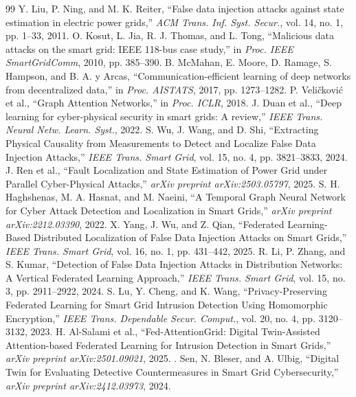 \documentclass[10pt, a4paper, twocolumn]{article}
\begin{document}
\begin{thebibliography}{99}
 Y. Liu, P. Ning, and M. K. Reiter, ``False data injection attacks against state estimation in electric power grids,'' \textit{ACM Trans. Inf. Syst. Secur.}, vol. 14, no. 1, pp. 1--33, 2011.
 O. Kosut, L. Jia, R. J. Thomas, and L. Tong, ``Malicious data attacks on the smart grid: IEEE 118-bus case study,'' in \textit{Proc. IEEE SmartGridComm}, 2010, pp. 385--390.
 B. McMahan, E. Moore, D. Ramage, S. Hampson, and B. A. y Arcas, ``Communication-efficient learning of deep networks from decentralized data,'' in \textit{Proc. AISTATS}, 2017, pp. 1273--1282.
 P. Veli\v{c}kovi\'{c} et al., ``Graph Attention Networks,'' in \textit{Proc. ICLR}, 2018.
 J. Duan et al., ``Deep learning for cyber-physical security in smart grids: A review,'' \textit{IEEE Trans. Neural Netw. Learn. Syst.}, 2022.
 S. Wu, J. Wang, and D. Shi, ``Extracting Physical Causality from Measurements to Detect and Localize False Data Injection Attacks,'' \textit{IEEE Trans. Smart Grid}, vol. 15, no. 4, pp. 3821--3833, 2024.
 J. Ren et al., ``Fault Localization and State Estimation of Power Grid under Parallel Cyber-Physical Attacks,'' \textit{arXiv preprint arXiv:2503.05797}, 2025.
 S. H. Haghshenas, M. A. Hasnat, and M. Naeini, ``A Temporal Graph Neural Network for Cyber Attack Detection and Localization in Smart Grids,'' \textit{arXiv preprint arXiv:2212.03390}, 2022.
 X. Yang, J. Wu, and Z. Qian, ``Federated Learning-Based Distributed Localization of False Data Injection Attacks on Smart Grids,'' \textit{IEEE Trans. Smart Grid}, vol. 16, no. 1, pp. 431--442, 2025.
 R. Li, P. Zhang, and S. Kumar, ``Detection of False Data Injection Attacks in Distribution Networks: A Vertical Federated Learning Approach,'' \textit{IEEE Trans. Smart Grid}, vol. 15, no. 3, pp. 2911--2922, 2024.
 S. Lu, Y. Cheng, and K. Wang, ``Privacy-Preserving Federated Learning for Smart Grid Intrusion Detection Using Homomorphic Encryption,'' \textit{IEEE Trans. Dependable Secur. Comput.}, vol. 20, no. 4, pp. 3120--3132, 2023.
 H. Al-Salami et al., ``Fed-AttentionGrid: Digital Twin-Assisted Attention-based Federated Learning for Intrusion Detection in Smart Grids,'' \textit{arXiv preprint arXiv:2501.09021}, 2025.
 . Sen, N. Bleser, and A. Ulbig, ``Digital Twin for Evaluating Detective Countermeasures in Smart Grid Cybersecurity,'' \textit{arXiv preprint arXiv:2412.03973}, 2024.

\end{thebibliography}
\end{document}

